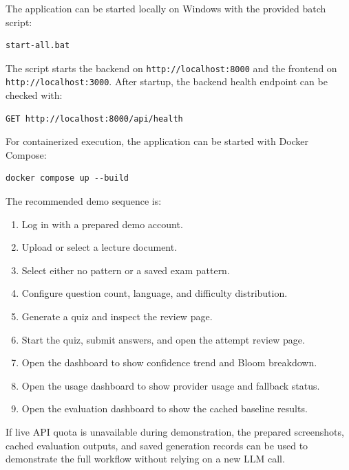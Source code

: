 \documentclass[12pt,a4paper]{article}
\begin{document}
The application can be started locally on Windows with the provided batch
script:

\begin{verbatim}
start-all.bat
\end{verbatim}

The script starts the backend on \texttt{http://localhost:8000} and the
frontend on \texttt{http://localhost:3000}. After startup, the backend
health endpoint can be checked with:

\begin{verbatim}
GET http://localhost:8000/api/health
\end{verbatim}

For containerized execution, the application can be started with Docker
Compose:

\begin{verbatim}
docker compose up --build
\end{verbatim}

The recommended demo sequence is:

\begin{enumerate}
  \item Log in with a prepared demo account.
  \item Upload or select a lecture document.
  \item Select either no pattern or a saved exam pattern.
  \item Configure question count, language, and difficulty distribution.
  \item Generate a quiz and inspect the review page.
  \item Start the quiz, submit answers, and open the attempt review page.
  \item Open the dashboard to show confidence trend and Bloom breakdown.
  \item Open the usage dashboard to show provider usage and fallback status.
  \item Open the evaluation dashboard to show the cached baseline results.
\end{enumerate}

If live API quota is unavailable during demonstration, the prepared
screenshots, cached evaluation outputs, and saved generation records can be
used to demonstrate the full workflow without relying on a new LLM call.
\end{document}
